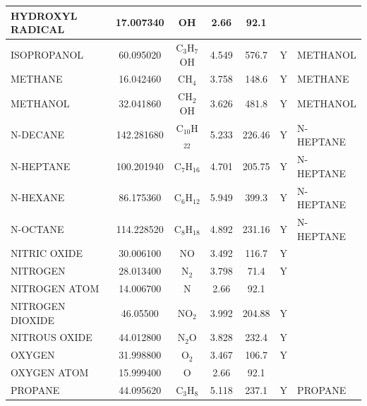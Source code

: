 \documentclass[11pt]{book}
\begin{document}
\begin{longtable}{@{\extracolsep{\fill}}|l|c|c|c|c|c|l|}
{\ct HYDROXYL RADICAL}   & 17.007340  & OH               & 2.66     & 92.1     &          &                            \\ \hline
{\ct ISOPROPANOL}        & 60.095020  & C$_3$H$_7$OH     & 4.549    & 576.7    &  Y       &  {\ct METHANOL}            \\ \hline
{\ct METHANE}            & 16.042460  & CH$_4$           & 3.758    & 148.6    &  Y       &  {\ct METHANE}             \\ \hline
{\ct METHANOL}           & 32.041860  & CH$_2$OH         & 3.626    & 481.8    &  Y       &  {\ct METHANOL}            \\ \hline
{\ct N-DECANE}           & 142.281680 & C$_{10}$H$_{22}$ & 5.233    & 226.46   &  Y       &  {\ct N-HEPTANE}           \\ \hline
{\ct N-HEPTANE}          & 100.201940 & C$_7$H$_{16}$    & 4.701    & 205.75   &  Y       &  {\ct N-HEPTANE}           \\ \hline
{\ct N-HEXANE}           & 86.175360  & C$_6$H$_{12}$    & 5.949    & 399.3    &  Y       &  {\ct N-HEPTANE}           \\ \hline
{\ct N-OCTANE}           & 114.228520 & C$_8$H$_{18}$    & 4.892    & 231.16   &  Y       &  {\ct N-HEPTANE}           \\ \hline
{\ct NITRIC OXIDE}       & 30.006100  & NO               & 3.492    & 116.7    &  Y       &                            \\ \hline
{\ct NITROGEN}           & 28.013400  & N$_2$            & 3.798    & 71.4     &  Y       &                            \\ \hline
{\ct NITROGEN ATOM}      & 14.006700  & N                & 2.66     & 92.1     &          &                            \\ \hline
{\ct NITROGEN DIOXIDE}   & 46.05500   & NO$_2$           & 3.992    & 204.88   &  Y       &                            \\ \hline
{\ct NITROUS OXIDE}      & 44.012800  & N$_2$O           & 3.828    & 232.4    &  Y       &                            \\ \hline
{\ct OXYGEN}             & 31.998800  & O$_2$            & 3.467    & 106.7    &  Y       &                            \\ \hline
{\ct OXYGEN ATOM}        & 15.999400  & O                & 2.66     & 92.1     &          &                            \\ \hline
{\ct PROPANE}            & 44.095620  & C$_3$H$_8$       & 5.118    & 237.1    &  Y       &  {\ct PROPANE}             \\ \hline

\end{longtable}
\end{document}
